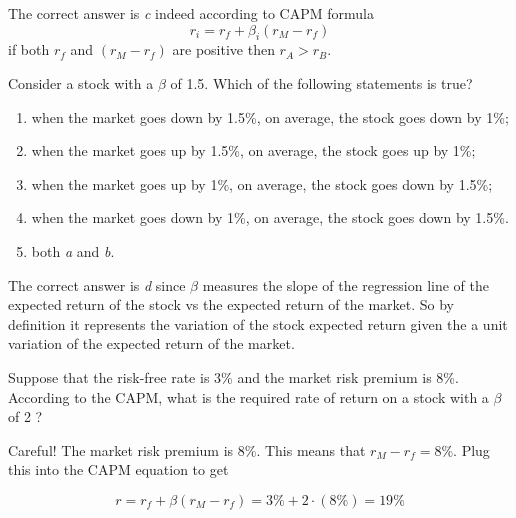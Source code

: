 \begin{solution}
The correct answer is \emph{c} indeed according to CAPM formula
\[r_i = r_f + \beta_i (r_M - r_f)\]
if both $r_f$ and $(r_M - r_f)$ are positive then $r_A \gt r_B$.
\end{solution}	

\begin{question}
Consider a stock with a $\beta$ of 1.5. Which of the following statements is true?
 
\begin{enumerate}[label=\emph{\alph*}]
\item when the market goes down by 1.5\%, on average, the stock goes down by 1\%;
\item when the market goes up by 1.5\%, on average, the stock goes up by 1\%;
\item when the market goes up by 1\%, on average, the stock goes down by 1.5\%;
\item when the market goes down by 1\%, on average, the stock goes down by 1.5\%. 
\item both \emph{a} and \emph{b}.	
\end{enumerate}
\end{question}

\begin{solution}
The correct answer is \emph{d} since $\beta$ measures the slope of the regression line of the expected return of the stock vs the expected return of the market. So by definition it represents the variation of the stock expected return given the a unit variation of the expected return of the market.
\end{solution}	

\begin{question}
Suppose that the risk-free rate is 3\% and the market risk premium is 8\%. According to the CAPM, what is the required rate of return on a stock with a $\beta$ of 2 ?
\end{question}

\begin{solution}
Careful! The market risk premium is 8\%. This means that $r_M - r_f  = 8\%$. Plug this into the CAPM equation to get

\[r = r_f + \beta(r_M - r_f) = 3\% + 2\cdot(8\%) =19\%\]
\end{solution}


